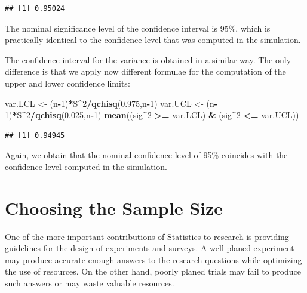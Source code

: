 \documentclass[]{krantz}
\makeatletter
\newenvironment{Shaded}{\begin{snugshade}}{\end{snugshade}}
\newcommand{\KeywordTok}[1]{\textcolor[rgb]{0.13,0.29,0.53}{\textbf{#1}}}
\newcommand{\DecValTok}[1]{\textcolor[rgb]{0.00,0.00,0.81}{#1}}
\newcommand{\FloatTok}[1]{\textcolor[rgb]{0.00,0.00,0.81}{#1}}
\newcommand{\StringTok}[1]{\textcolor[rgb]{0.31,0.60,0.02}{#1}}
\newcommand{\OperatorTok}[1]{\textcolor[rgb]{0.81,0.36,0.00}{\textbf{#1}}}
\newcommand{\NormalTok}[1]{#1}
\newenvironment{kframe}{%
\medskip{}
\setlength{\fboxsep}{.8em}
 \def\at@end@of@kframe{}%
 \ifinner\ifhmode%
  \def\at@end@of@kframe{\end{minipage}}%
  \begin{minipage}{\columnwidth}%
 \fi\fi%
 \def\FrameCommand##1{\hskip\@totalleftmargin \hskip-\fboxsep
 \colorbox{shadecolor}{##1}\hskip-\fboxsep
     \hskip-\linewidth \hskip-\@totalleftmargin \hskip\columnwidth}%
 \MakeFramed {\advance\hsize-\width
   \@totalleftmargin\z@ \linewidth\hsize
   \@setminipage}}%
 {\par\unskip\endMakeFramed%
 \at@end@of@kframe}
\renewenvironment{Shaded}{\begin{kframe}}{\end{kframe}}
\theoremstyle{definition}
\theoremstyle{definition}
\theoremstyle{definition}
\theoremstyle{remark}
\makeatother
\begin{document}
\begin{verbatim}
## [1] 0.95024
\end{verbatim}

The nominal significance level of the confidence interval is 95\%, which
is practically identical to the confidence level that was computed in
the simulation.

The confidence interval for the variance is obtained in a similar way.
The only difference is that we apply now different formulae for the
computation of the upper and lower confidence limits:

\begin{Shaded}
\begin{Highlighting}[]
\NormalTok{var.LCL <-}\StringTok{ }\NormalTok{(n}\OperatorTok{-}\DecValTok{1}\NormalTok{)}\OperatorTok{*}\NormalTok{S}\OperatorTok{^}\DecValTok{2}\OperatorTok{/}\KeywordTok{qchisq}\NormalTok{(}\FloatTok{0.975}\NormalTok{,n}\OperatorTok{-}\DecValTok{1}\NormalTok{)}
\NormalTok{var.UCL <-}\StringTok{ }\NormalTok{(n}\OperatorTok{-}\DecValTok{1}\NormalTok{)}\OperatorTok{*}\NormalTok{S}\OperatorTok{^}\DecValTok{2}\OperatorTok{/}\KeywordTok{qchisq}\NormalTok{(}\FloatTok{0.025}\NormalTok{,n}\OperatorTok{-}\DecValTok{1}\NormalTok{)}
\KeywordTok{mean}\NormalTok{((sig}\OperatorTok{^}\DecValTok{2} \OperatorTok{>=}\StringTok{ }\NormalTok{var.LCL) }\OperatorTok{&}\StringTok{ }\NormalTok{(sig}\OperatorTok{^}\DecValTok{2} \OperatorTok{<=}\StringTok{ }\NormalTok{var.UCL))}
\end{Highlighting}
\end{Shaded}

\begin{verbatim}
## [1] 0.94945
\end{verbatim}

Again, we obtain that the nominal confidence level of 95\% coincides
with the confidence level computed in the simulation.

\section{Choosing the Sample Size}\label{choosing-the-sample-size}

One of the more important contributions of Statistics to research is
providing guidelines for the design of experiments and surveys. A well
planed experiment may produce accurate enough answers to the research
questions while optimizing the use of resources. On the other hand,
poorly planed trials may fail to produce such answers or may waste
valuable resources.
\end{document}
